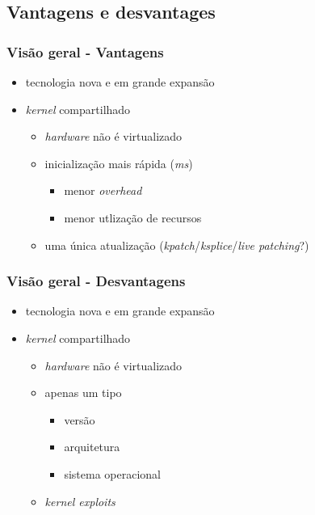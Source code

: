 \documentclass{beamer}
\begin{document}
\subsection{Vantagens e desvantages}

\begin{frame}
    \frametitle{Visão geral - Vantagens}
    \begin{itemize}
        \item tecnologia nova e em grande expansão
        \item \textit{kernel} compartilhado
            \begin{itemize}
                \item \textit{hardware} não é virtualizado
                \item inicialização mais rápida (\textit{ms})
                \begin{itemize}
                    \item menor \textit{overhead}
                    \item menor utlização de recursos
                \end{itemize}
                \item uma única atualização
                    (\textit{kpatch}/\textit{ksplice}/\textit{live patching}?)
            \end{itemize}
    \end{itemize}
\end{frame}

\begin{frame}
    \frametitle{Visão geral - Desvantagens}
    \begin{itemize}
        \item tecnologia nova e em grande expansão
        \item \textit{kernel} compartilhado
        \begin{itemize}
            \item \textit{hardware} não é virtualizado
            \item apenas um tipo
            \begin{itemize}
                \item versão
                \item arquitetura
                \item sistema operacional
            \end{itemize}
            \item \textit{kernel exploits}
        \end{itemize}
    \end{itemize}
\end{frame}
\end{document}
